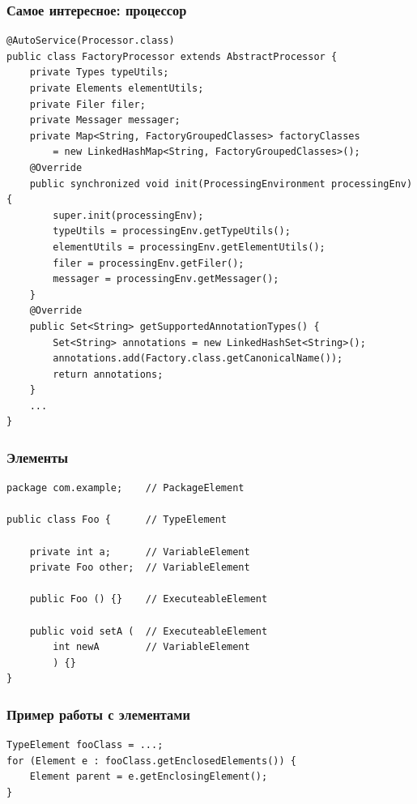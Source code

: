 \documentclass[xetex,mathserif,serif]{beamer}
\begin{document}
	\begin{frame}[fragile]
		\frametitle{Самое интересное: процессор}
		\begin{scriptsize}
			\begin{verbatim}
@AutoService(Processor.class)
public class FactoryProcessor extends AbstractProcessor {
    private Types typeUtils;
    private Elements elementUtils;
    private Filer filer;
    private Messager messager;
    private Map<String, FactoryGroupedClasses> factoryClasses 
        = new LinkedHashMap<String, FactoryGroupedClasses>();
    @Override
    public synchronized void init(ProcessingEnvironment processingEnv) {
        super.init(processingEnv);
        typeUtils = processingEnv.getTypeUtils();
        elementUtils = processingEnv.getElementUtils();
        filer = processingEnv.getFiler();
        messager = processingEnv.getMessager();
    }
    @Override
    public Set<String> getSupportedAnnotationTypes() {
        Set<String> annotations = new LinkedHashSet<String>();
        annotations.add(Factory.class.getCanonicalName());
        return annotations;
    }
    ...
}
			\end{verbatim}
		\end{scriptsize}
	\end{frame}

	\begin{frame}[fragile]
		\frametitle{Элементы}
		\begin{small}
			\begin{verbatim}
package com.example;    // PackageElement

public class Foo {      // TypeElement

    private int a;      // VariableElement
    private Foo other;  // VariableElement

    public Foo () {}    // ExecuteableElement

    public void setA (  // ExecuteableElement
        int newA        // VariableElement
        ) {}
}
			\end{verbatim}
		\end{small}
	\end{frame}

	\begin{frame}[fragile]
		\frametitle{Пример работы с элементами}
		\begin{verbatim}
TypeElement fooClass = ...;
for (Element e : fooClass.getEnclosedElements()) {
    Element parent = e.getEnclosingElement();
}
		\end{verbatim}
	\end{frame}
\end{document}
